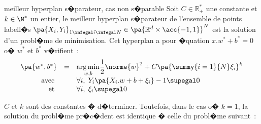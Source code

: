             \begin{xproblem}{meilleur hyperplan s�parateur, cas non s�parable}\label{svm_problem_def_2}
            Soit $C \in \mathbb{R}^*_+$ une constante et $k \in \N^*$ un entier,
            le meilleur hyperplan s�parateur de l'ensemble de points labell�s
            $\pa{X_i,Y_i}_{1 \infegal i \infegal N} \in \pa{ \mathbb{R}^d \times \acc{-1,1} }^N$ est la solution
            d'un probl�me de minimisation. Cet hyperplan a pour �quation $x.w^* + b^* = 0$ o� 
            $w^*$ et $b^*$ v�rifient~:
                    $$
                    \begin{array}{rcl}    \pa{w^*,b^*} &=& \underset{w,b}{\arg \min} \dfrac{1}{2} \norme{w}^2 + 
                                                                                                C \pa{\summy{i=1}{N} \xi_i}^k \\
                                         \text{avec }      && \forall i, \; Y_i \pa{ X_i .w + b + \xi_i } - 1 \supegal 0 \\
                                         \text{et }            && \forall i, \; \xi_i \supegal 0 
                    \end{array}                                        
                    $$
            \end{xproblem}

$C$ et $k$ sont des constantes � d�terminer. Toutefois, dans le cas o� $k = 1$, la solution du probl�me pr�c�dent est identique � celle du probl�me suivant~:


